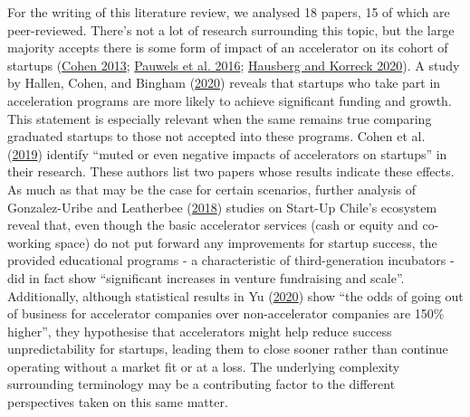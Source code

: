 \documentclass[
  12pt,
]{article}
\begin{document}
For the writing of this literature review, we analysed 18 papers, 15 of which are peer-reviewed. There's not a lot of research surrounding this topic, but the large majority accepts there is some form of impact of an accelerator on its cohort of startups (\protect\hyperlink{ref-cohen_how_2013}{Cohen 2013}; \protect\hyperlink{ref-pauwels_understanding_2016}{Pauwels et al. 2016}; \protect\hyperlink{ref-hausberg_business_2020}{Hausberg and Korreck 2020}). A study by Hallen, Cohen, and Bingham (\protect\hyperlink{ref-hallen_accelerators_2020}{2020}) reveals that startups who take part in acceleration programs are more likely to achieve significant funding and growth. This statement is especially relevant when the same remains true comparing graduated startups to those not accepted into these programs. Cohen et al. (\protect\hyperlink{ref-cohen_design_2019}{2019}) identify ``muted or even negative impacts of accelerators on startups'' in their research. These authors list two papers whose results indicate these effects. As much as that may be the case for certain scenarios, further analysis of Gonzalez-Uribe and Leatherbee (\protect\hyperlink{ref-gonzalez_effects_2018}{2018}) studies on Start-Up Chile's ecosystem reveal that, even though the basic accelerator services (cash or equity and co-working space) do not put forward any improvements for startup success, the provided educational programs - a characteristic of third-generation incubators - did in fact show ``significant increases in venture fundraising and scale''. Additionally, although statistical results in Yu (\protect\hyperlink{ref-yu_accelerators_2020}{2020}) show ``the odds of going out of business for accelerator companies over non-accelerator companies are 150\% higher'', they hypothesise that accelerators might help reduce success unpredictability for startups, leading them to close sooner rather than continue operating without a market fit or at a loss. The underlying complexity surrounding terminology may be a contributing factor to the different perspectives taken on this same matter.
\end{document}
